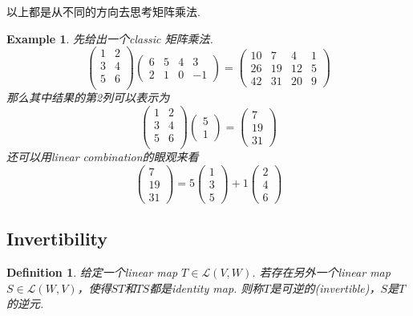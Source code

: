 \documentclass{article}
\newtheorem{example}[theorem]{Example}
\newtheorem{definition}[theorem]{Definition}
\begin{document}
以上都是从不同的方向去思考矩阵乘法.

\begin{example}
\rm 先给出一个classic 矩阵乘法.
$$
\begin{pmatrix}
1 & 2 \\
3 & 4 \\
5 & 6 \\
\end{pmatrix}
\begin{pmatrix}
6 & 5 & 4 & 3 \\
2 & 1 & 0 & -1
\end{pmatrix} = 
\begin{pmatrix}
10 & 7 & 4 & 1 \\
26 & 19 & 12 & 5 \\
42 & 31 & 20 & 9
\end{pmatrix}
$$
那么其中结果的第2列可以表示为
$$
\begin{pmatrix}
1 & 2 \\
3 & 4 \\
5 & 6 \\
\end{pmatrix}
\begin{pmatrix}
5 \\
1 
\end{pmatrix} = 
\begin{pmatrix}
7 \\
19 \\
31 
\end{pmatrix}
$$
还可以用linear combination的眼观来看
$$
\begin{pmatrix}
7 \\
19 \\
31 
\end{pmatrix} =
5\begin{pmatrix}
1 \\
3 \\
5 
\end{pmatrix} + 
1 \begin{pmatrix}
2 \\
4 \\
6
\end{pmatrix}
$$
\end{example}

\newpage
\subsection{Invertibility}

\begin{definition}
\rm 给定一个linear map $T \in \mathcal{L}(V,W)$. 若存在另外一个linear map $S \in \mathcal{L}(W,V)$，使得$ST$和$TS$都是identity map. 则称$T$是可逆的(invertible)，$S$是$T$的逆元.
\end{definition}
\end{document}
